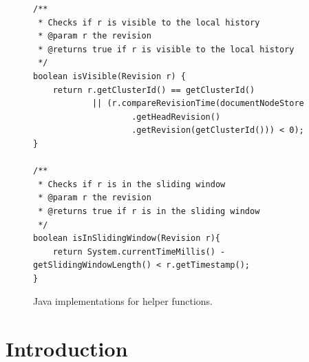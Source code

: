 \documentclass[abstracton,12pt]{scrreprt}
\begin{document}
\begin{figure}[h]
    \begin{framed}
        \begin{scriptsize}
            \begin{verbatim}
/**
 * Checks if r is visible to the local history
 * @param r the revision
 * @returns true if r is visible to the local history
 */
boolean isVisible(Revision r) {
    return r.getClusterId() == getClusterId()
            || (r.compareRevisionTime(documentNodeStore
                    .getHeadRevision()
                    .getRevision(getClusterId())) < 0);
}

/**
 * Checks if r is in the sliding window
 * @param r the revision
 * @returns true if r is in the sliding window
 */
boolean isInSlidingWindow(Revision r){
    return System.currentTimeMillis() - getSlidingWindowLength() < r.getTimestamp();
}
            \end{verbatim}
        \end{scriptsize}
    \end{framed}
    \caption{Java implementations for helper functions.}
    \label{algo:helper_functions}
\end{figure}




















\newpage
\newpage

\chapter{Introduction}
 
\end{document}
